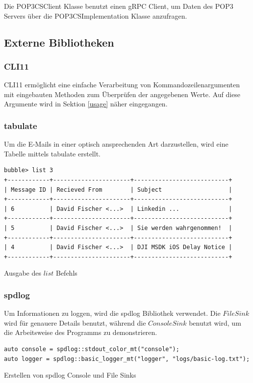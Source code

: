 \documentclass[12pt, letterpaper]{article}
\newenvironment{code}{\captionsetup{type=listing}}{}
\begin{document}
Die POP3CSClient Klasse benutzt einen gRPC Client, um Daten des POP3 Servers über die POP3CSImplementation Klasse anzufragen.

\subsection{Externe Bibliotheken}
\label{extBib}

\subsubsection{CLI11}
CLI11\cite{cli11_ref} ermöglicht eine einfache Verarbeitung von Kommandozeilenargumenten mit eingebauten Methoden zum Überprüfen der angegebenen Werte. Auf diese Argumente wird in Sektion \ref{usage} näher eingegangen.

\subsubsection{tabulate}
Um die E-Mails in einer optisch ansprechenden Art darzustellen, wird eine Tabelle mittels tabulate\cite{tabulate_ref} erstellt.

\begin{code}
  \begin{verbatim}
bubble> list 3
+------------+----------------------+---------------------------+
| Message ID | Recieved From        | Subject                   | 
+------------+----------------------+---------------------------+
| 6          | David Fischer <...>  | Linkedin ...              | 
+------------+----------------------+---------------------------+
| 5          | David Fischer <...>  | Sie werden wahrgenommen!  |
+------------+----------------------+---------------------------+
| 4          | David Fischer <...>  | DJI MSDK iOS Delay Notice |
+------------+----------------------+---------------------------+
  \end{verbatim}
  \caption{Ausgabe des $list$ Befehls}
\end{code}

\subsubsection{spdlog}
Um Informationen zu loggen, wird die spdlog\cite{spdlog_ref} Bibliothek verwendet. Die $File Sink$ wird für genauere Details benutzt, während die $Console Sink$ benutzt wird, um die Arbeitsweise des Programms zu demonstrieren.

\begin{code}
\begin{verbatim}
auto console = spdlog::stdout_color_mt("console");
auto logger = spdlog::basic_logger_mt("logger", "logs/basic-log.txt");
\end{verbatim}
\caption{Erstellen von spdlog Console und File Sinks}
\label{spdlog_code}
\end{code}
\end{document}
